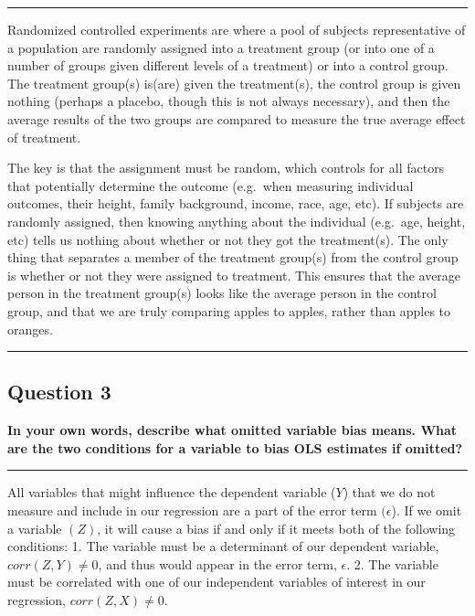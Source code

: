 \documentclass[
]{article}
\begin{document}
\begin{center}\rule{0.5\linewidth}{0.5pt}\end{center}

Randomized controlled experiments are where a pool of subjects
representative of a population are randomly assigned into a treatment
group (or into one of a number of groups given different levels of a
treatment) or into a control group. The treatment group(s) is(are) given
the treatment(s), the control group is given nothing (perhaps a placebo,
though this is not always necessary), and then the average results of
the two groups are compared to measure the true average effect of
treatment.

The key is that the assignment must be random, which controls for all
factors that potentially determine the outcome (e.g.~when measuring
individual outcomes, their height, family background, income, race, age,
etc). If subjects are randomly assigned, then knowing anything about the
individual (e.g.~age, height, etc) tells us nothing about whether or not
they got the treatment(s). The only thing that separates a member of the
treatment group(s) from the control group is whether or not they were
assigned to treatment. This ensures that the average person in the
treatment group(s) looks like the average person in the control group,
and that we are truly comparing apples to apples, rather than apples to
oranges.

\begin{center}\rule{0.5\linewidth}{0.5pt}\end{center}

\hypertarget{question-3}{%
\subsection{Question 3}\label{question-3}}

\textbf{In your own words, describe what omitted variable bias means.
What are the two conditions for a variable to bias OLS estimates if
omitted?}

\begin{center}\rule{0.5\linewidth}{0.5pt}\end{center}

All variables that might influence the dependent variable (\(Y\)) that
we do not measure and include in our regression are a part of the error
term \((\epsilon\)). If we omit a variable \((Z)\), it will cause a bias
if and only if it meets both of the following conditions: 1. The
variable must be a determinant of our dependent variable,
\(corr(Z,Y)\neq 0\), and thus would appear in the error term,
\(\epsilon\). 2. The variable must be correlated with one of our
independent variables of interest in our regression,
\(corr(Z,X) \neq 0\).
\end{document}
